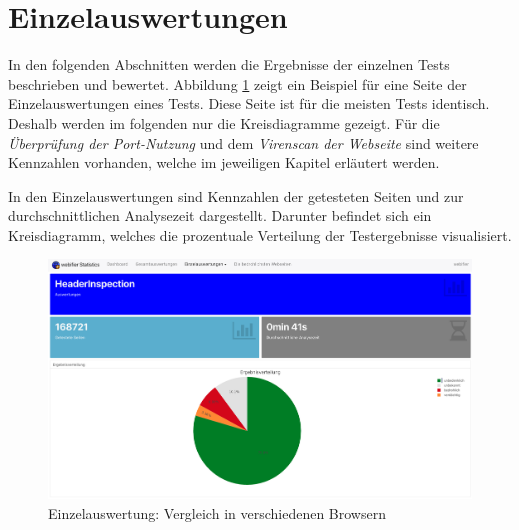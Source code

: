 \section{Einzelauswertungen}
In den folgenden Abschnitten werden die Ergebnisse der einzelnen Tests beschrieben und bewertet. Abbildung \ref{fig:analyse-headerinspection} zeigt ein Beispiel für eine Seite der Einzelauswertungen eines Tests. Diese Seite ist für die meisten Tests identisch. Deshalb werden im folgenden nur die Kreisdiagramme gezeigt. Für die \textit{Überprüfung der Port-Nutzung }und dem \textit{Virenscan der Webseite} sind weitere Kennzahlen vorhanden, welche im jeweiligen Kapitel erläutert werden.

In den Einzelauswertungen sind Kennzahlen der getesteten Seiten und zur durchschnittlichen Analysezeit dargestellt. Darunter befindet sich ein Kreisdiagramm, welches die prozentuale Verteilung der Testergebnisse visualisiert.
\begin{figure}[H]
  \centering
  \includegraphics[width=\textwidth]{images/stats/headerinspection}
  \caption[Einzelauswertung: Vergleich in verschiedenen Browsern]{Einzelauswertung: Vergleich in verschiedenen Browsern\protect\footnotemark}
  \label{fig:analyse-headerinspection}
\end{figure}


